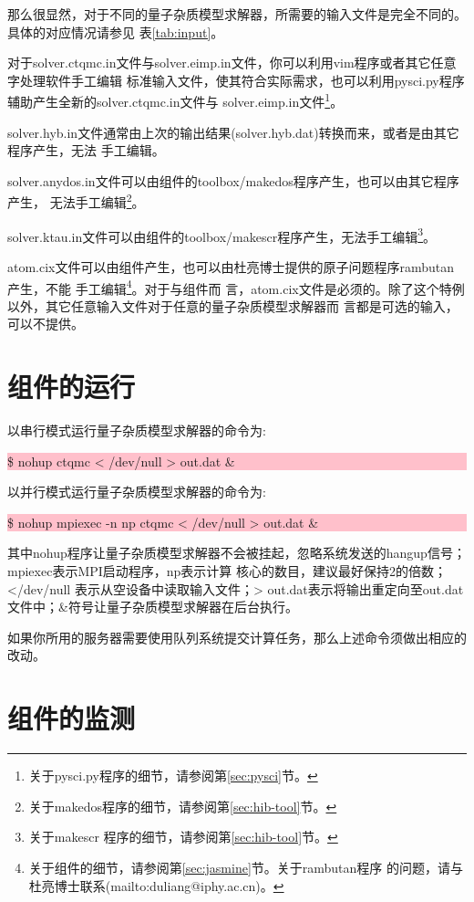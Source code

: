 那么很显然，对于不同的量子杂质模型求解器，所需要的输入文件是完全不同的。具体的对应情况请参见
表\ref{tab:input}。

对于solver.ctqmc.in文件与solver.eimp.in文件，你可以利用vim程序或者其它任意字处理软件手工编辑
标准输入文件，使其符合实际需求，也可以利用pysci.py程序辅助产生全新的solver.ctqmc.in文件与
solver.eimp.in文件\footnote{关于pysci.py程序的细节，请参阅第\ref{sec:pysci}节。}。

solver.hyb.in文件通常由上次的输出结果(solver.hyb.dat)转换而来，或者是由其它程序产生，无法
手工编辑。

solver.anydos.in文件可以由{\hibiscus}组件的toolbox/makedos程序产生，也可以由其它程序产生，
无法手工编辑\footnote{关于makedos程序的细节，请参阅第\ref{sec:hib-tool}节。}。

solver.ktau.in文件可以由{\hibiscus}组件的toolbox/makescr程序产生，无法手工编辑\footnote{关于makescr
程序的细节，请参阅第\ref{sec:hib-tool}节。}。

atom.cix文件可以由{\jasmine}组件产生，也可以由杜亮博士提供的原子问题程序rambutan产生，不能
手工编辑\footnote{关于{\jasmine}组件的细节，请参阅第\ref{sec:jasmine}节。关于rambutan程序
的问题，请与杜亮博士联系(mailto:duliang@iphy.ac.cn)。}。对于{\begonia}与{\lavender}组件而
言，atom.cix文件是必须的。除了这个特例以外，其它任意输入文件对于任意的量子杂质模型求解器而
言都是可选的输入，可以不提供。

\section{{\iqist}组件的运行}
\label{sec:run_iqist}

以串行模式运行量子杂质模型求解器的命令为:

\noindent\colorbox{pink}{\parbox[r]{\linewidth}{\quad \$ nohup ctqmc < /dev/null > out.dat \&}}

以并行模式运行量子杂质模型求解器的命令为:

\noindent\colorbox{pink}{\parbox[r]{\linewidth}{\quad \$ nohup mpiexec -n np ctqmc < /dev/null > out.dat \&}}

其中nohup程序让量子杂质模型求解器不会被挂起，忽略系统发送的hangup信号；mpiexec表示MPI启动程序，np表示计算
核心的数目，建议最好保持2的倍数；</dev/null 表示从空设备中读取输入文件；> out.dat表示将输出重定向至out.dat
文件中；\&符号让量子杂质模型求解器在后台执行。

如果你所用的服务器需要使用队列系统提交计算任务，那么上述命令须做出相应的改动。

\section{{\iqist}组件的监测}
\label{sec:monitor_iqist}

